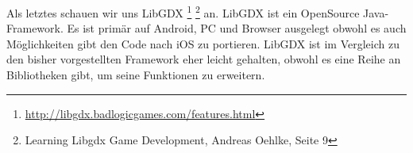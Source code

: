 Als letztes schauen wir uns LibGDX \footnote{\url{http://libgdx.badlogicgames.com/features.html}} \footnote{Learning Libgdx Game Development, Andreas Oehlke, Seite 9 } an. LibGDX ist ein OpenSource Java-Framework. Es ist primär auf Android, PC und Browser ausgelegt obwohl es auch Möglichkeiten gibt den Code nach iOS zu portieren. LibGDX ist im Vergleich zu den bisher vorgestellten Framework eher leicht gehalten, obwohl es eine Reihe an Bibliotheken gibt, um seine Funktionen zu erweitern.